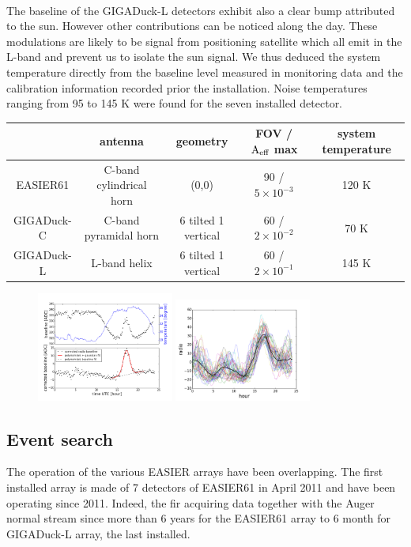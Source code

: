 \documentclass{PoS}
\begin{document}
\\The baseline of the GIGADuck-L detectors exhibit also a clear bump attributed to the sun. However other contributions can be noticed along the day. These modulations are likely to be signal from positioning satellite which all emit in the L-band and prevent us to isolate the sun signal. We thus deduced the system temperature directly from the baseline level measured in monitoring data and the calibration information recorded prior the installation. Noise temperatures ranging from 95 to 145 K were found for the seven installed detector.
\begin{center}
  \begin{tabular}{ | c | c | c | c | c |}
    \hline
	& antenna & geometry & FOV / $\rm A_{eff}$ max & system temperature \\ \hline
	EASIER61 & C-band cylindrical horn & (0,0) & 90 / $5\times 10^{-3}$ & 120 K\\ \hline
	GIGADuck-C & C-band pyramidal horn & 6 tilted 1 vertical  & 60 / $2 \times 10^{-2}$ & 70 K\\ \hline
	GIGADuck-L & L-band helix & 6 tilted 1 vertical  & 60 / $2 \times 10^{-1}$ & 145 K\\ \hline
  \end{tabular}
\end{center}
\begin{figure}[h]
\centering
\includegraphics[width=0.4\textwidth]{newfitexamp.png}
\includegraphics[width=0.4\textwidth]{jorgehour.png}
\caption{}
\label{fig:baselines}
\end{figure}
\subsection{Event search}
\label{sec:easierevent}
The operation of the various EASIER arrays have been overlapping. The first installed array is made of 7 detectors of EASIER61 in April 2011 and   have been operating since 2011. Indeed, the fir acquiring data together with the Auger normal stream since more than 6 years for the EASIER61 array to 6 month for GIGADuck-L array, the last installed. 
\end{document}
